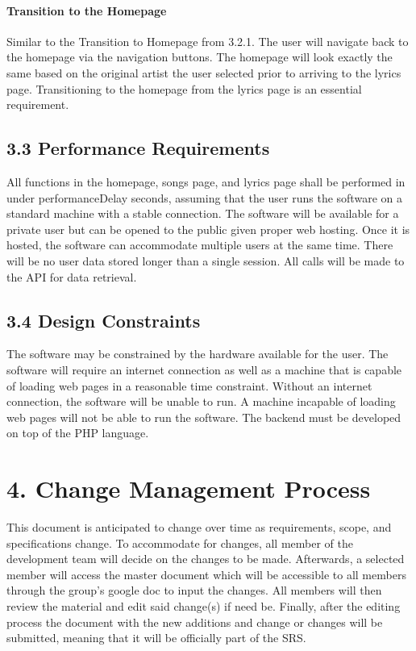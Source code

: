 \documentclass[]{article}
\begin{document}
\paragraph{Transition to the
Homepage}\label{transition-to-the-homepage-1}

Similar to the Transition to Homepage from 3.2.1. The user will navigate
back to the homepage via the navigation buttons. The homepage will look
exactly the same based on the original artist the user selected prior to
arriving to the lyrics page. Transitioning to the homepage from the
lyrics page is an essential requirement.

\subsection{3.3 Performance
Requirements}\label{performance-requirements}

All functions in the homepage, songs page, and lyrics page shall be
performed in under performanceDelay seconds, assuming that the user runs
the software on a standard machine with a stable connection. The
software will be available for a private user but can be opened to the
public given proper web hosting. Once it is hosted, the software can
accommodate multiple users at the same time. There will be no user data
stored longer than a single session. All calls will be made to the API
for data retrieval.

\subsection{3.4 Design Constraints}\label{design-constraints}

The software may be constrained by the hardware available for the user.
The software will require an internet connection as well as a machine
that is capable of loading web pages in a reasonable time constraint.
Without an internet connection, the software will be unable to run. A
machine incapable of loading web pages will not be able to run the
software. The backend must be developed on top of the PHP language.

\section{4. Change Management Process}\label{change-management-process}

This document is anticipated to change over time as requirements, scope,
and specifications change. To accommodate for changes, all member of the
development team will decide on the changes to be made. Afterwards, a
selected member will access the master document which will be accessible
to all members through the group's google doc to input the changes. All
members will then review the material and edit said change(s) if need
be. Finally, after the editing process the document with the new
additions and change or changes will be submitted, meaning that it will
be officially part of the SRS.
\end{document}
